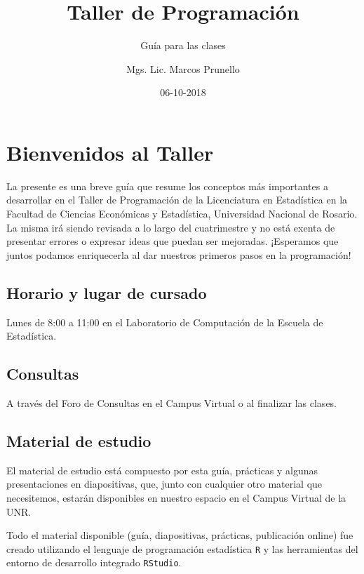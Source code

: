 \documentclass[]{book}
\title{Taller de Programación}
\subtitle{Guía para las clases}
\author{Mgs. Lic. Marcos Prunello}
\date{06-10-2018}
\begin{document}
\maketitle

{
\setcounter{tocdepth}{1}
\tableofcontents
}
\chapter{Bienvenidos al Taller}\label{bienvenidos-al-taller}

La presente es una breve guía que resume los conceptos más importantes a
desarrollar en el Taller de Programación de la Licenciatura en
Estadística en la Facultad de Ciencias Económicas y Estadística,
Universidad Nacional de Rosario. La misma irá siendo revisada a lo largo
del cuatrimestre y no está exenta de presentar errores o expresar ideas
que puedan ser mejoradas. ¡Esperamos que juntos podamos enriquecerla al
dar nuestros primeros pasos en la programación!

\section*{Horario y lugar de cursado}\label{horario-y-lugar-de-cursado}

Lunes de 8:00 a 11:00 en el Laboratorio de Computación de la Escuela de
Estadística.

\section*{Consultas}\label{consultas}

A través del Foro de Consultas en el Campus Virtual o al finalizar las
clases.

\section*{Material de estudio}\label{material-de-estudio}

El material de estudio está compuesto por esta guía, prácticas y algunas
presentaciones en diapositivas, que, junto con cualquier otro material
que necesitemos, estarán disponibles en nuestro espacio en el Campus
Virtual de la UNR.

Todo el material disponible (guía, diapositivas, prácticas, publicación
online) fue creado utilizando el lenguaje de programación estadística
\texttt{R} y las herramientas del entorno de desarrollo integrado
\texttt{RStudio}.
\end{document}
